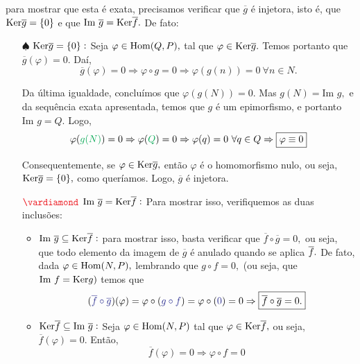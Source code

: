 \documentclass[11pt,a4paper]{article}
\begin{document}
\begin{center}
\end{center} para mostrar que esta é exata, precisamos verificar que $\overline{g}$ é injetora, isto é, que ${\rm Ker} \overline{g} = \{ 0 \}$ e que $\mbox{Im } \overline{g} = {\rm Ker} \overline{f}.$ De fato:
\begin{itemize}
    \item[$\spadesuit$] ${\rm Ker} \overline{g} = \{ 0 \}:$ Seja $\varphi \in {\rm Hom } (Q,P),$ tal que $\varphi \in {\rm Ker} \overline{g}.$ Temos portanto que $\overline{g}(\varphi) = 0.$ Daí,
    \[
    \overline{g}(\varphi) = 0 \Rightarrow \varphi \circ g = 0 \Rightarrow \varphi(g(n)) = 0 \ \forall n \in N.
    \]
    
    Da última igualdade, concluímos que $\varphi(g(N)) = 0.$ Mas $g(N) = \mbox{Im } g,$ e da sequência exata apresentada, temos que $g$ é um epimorfismo, e portanto $\mbox{Im } g = Q.$ Logo,
    \[
    \varphi(\textcolor{Green}{g(N)}) = 0 \Rightarrow \varphi(\textcolor{Green}{Q}) = 0 \Rightarrow \varphi(q) = 0 \ \forall q \in Q \Rightarrow \boxed{\varphi \equiv 0}
    \]
    
    Consequentemente, se $\varphi \in {\rm Ker} \overline{g},$ então $\varphi$ é o homomorfismo nulo, ou seja, ${\rm Ker} \overline{g} = \{ 0 \},$ como queríamos. Logo, $\overline{g}$ é injetora.
    
    \item[$\textcolor{Red}{\vardiamond}$] $\mbox{Im } \overline{g} = {\rm Ker} \overline{f}:$ Para mostrar isso, verifiquemos as duas inclusões:
    \begin{itemize}
        \item $\mbox{Im } \overline{g} \subseteq {\rm Ker} \overline{f}:$ para mostrar isso, basta verificar que $\overline{f} \circ \overline{g} = 0,$ ou seja, que todo elemento da imagem de $\overline{g}$ é anulado quando se aplica $\overline{f}.$  De fato, dada $\varphi \in {\rm Hom }(N,P),$ lembrando que  $g \circ f = 0,$ (ou seja, que $\mbox{Im } f = {\rm Ker} g)$ temos que
        \[
        (\textcolor{Blue}{\overline{f} \circ \overline{g}})(\varphi) =  \varphi \circ (\textcolor{Blue}{g \circ f}) = \varphi \circ (\textcolor{Blue}{0}) = 0 \Rightarrow \boxed{\overline{f} \circ \overline{g} = 0.}
        \]
        \item $ {\rm Ker} \overline{f} \subseteq \mbox{Im } \overline{g}:$ Seja $\varphi \in {\rm Hom }(N,P)$ tal que $\varphi \in {\rm Ker} \overline{f},$ ou seja, $\overline{f}(\varphi) = 0.$ Então, 
        \[
        \overline{f}(\varphi) = 0 \Rightarrow \varphi \circ f = 0
        \]
        

\end{itemize}
\end{itemize}
\end{document}
